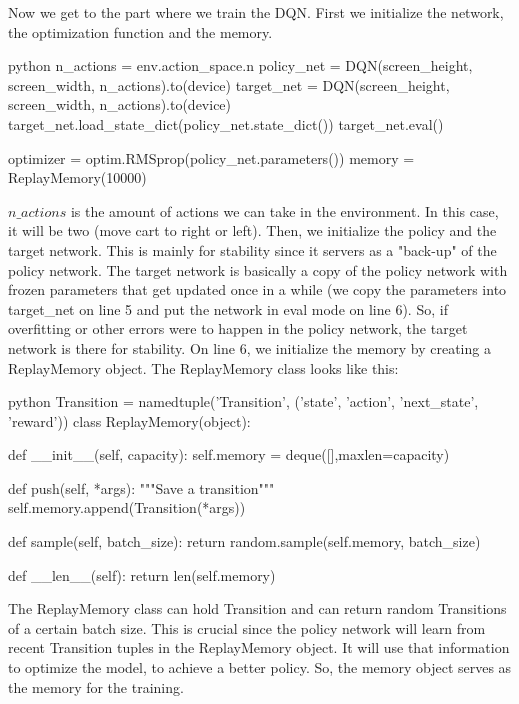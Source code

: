 \documentclass{article}
\numberwithin{equation}{section}
\numberwithin{equation}{section}
\begin{document}
Now we get to the part where we train the DQN.
First we initialize the network, the optimization function and the memory.

\begin{mintedbox}{python}
n_actions = env.action_space.n
policy_net = DQN(screen_height, screen_width, n_actions).to(device)
target_net = DQN(screen_height, screen_width, n_actions).to(device)
target_net.load_state_dict(policy_net.state_dict())
target_net.eval()

optimizer = optim.RMSprop(policy_net.parameters())
memory = ReplayMemory(10000)
\end{mintedbox}

$n\_actions$ is the amount of actions we can take in the environment. In this case, it will be two (move cart to right or left). Then, we initialize the policy and the target network. This is mainly for stability since it servers as a "back-up" of the policy network. The target network is basically a copy of the policy network with frozen parameters that get updated once in a while (we copy the parameters into target\_net on line 5 and put the network in eval mode on line 6). So, if overfitting or other errors were to happen in the policy network, the target network is there for stability. On line 6, we initialize the memory by creating a ReplayMemory object. The ReplayMemory class looks like this:

\begin{mintedbox}{python}
Transition = namedtuple('Transition',
                        ('state', 'action', 'next_state', 'reward'))
class ReplayMemory(object):

    def __init__(self, capacity):
        self.memory = deque([],maxlen=capacity)

    def push(self, *args):
        """Save a transition"""
        self.memory.append(Transition(*args))

    def sample(self, batch_size):
        return random.sample(self.memory, batch_size)

    def __len__(self):
        return len(self.memory)
\end{mintedbox}

The ReplayMemory class can hold Transition and  can return random Transitions of a certain batch size. This is crucial since the policy network will learn from recent Transition tuples in the ReplayMemory object. It will use that information to optimize the model, to achieve a better policy. So, the memory object serves as the memory for the training.\\
\end{document}
